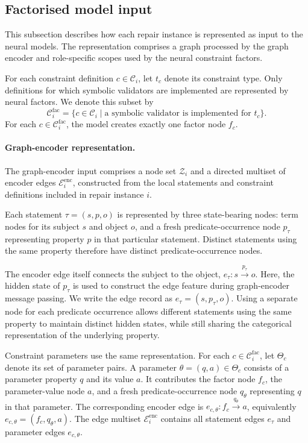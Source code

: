 \documentclass[a4paper,UKenglish,cleveref,autoref,thm-restate]{tgdk-v2021}
\begin{document}
\subsection{Factorised model input}
\label{subsec:factor-graph}

This subsection describes how each repair instance is represented as input to the neural models. The representation comprises a graph processed by the graph encoder and role-specific scopes used by the neural constraint factors.

For each constraint definition \(c\in\mathcal{C}_i\), let \(t_c\) denote its constraint type. Only definitions for which symbolic validators are implemented are represented by neural factors. We denote this subset by
\[
\mathcal{C}_i^{\mathrm{fac}}=\{c\in\mathcal{C}_i\mid\text{a symbolic validator is implemented for }t_c\}.
\]
For each \(c\in\mathcal{C}_i^{\mathrm{fac}}\), the model creates exactly one factor node \(f_c\).

\paragraph*{Graph-encoder representation.} The graph-encoder input comprises a node set \(\mathcal{Z}_i\) and a directed multiset of encoder edges \(\mathcal{E}_i^{\mathrm{enc}}\), constructed from the local statements and constraint definitions included in repair instance \(i\).

Each statement \(\tau=(s,p,o)\) is represented by three state-bearing nodes: term nodes for its subject \(s\) and object \(o\), and a fresh predicate-occurrence node \(p_\tau\) representing property \(p\) in that particular statement. Distinct statements using the same property therefore have distinct predicate-occurrence nodes.

The encoder edge itself connects the subject to the object, \(e_\tau:s\xrightarrow{p_\tau}o\). Here, the hidden state of \(p_\tau\) is used to construct the edge feature during graph-encoder message passing. We write the edge record as \(e_\tau=(s,p_\tau,o)\). Using a separate node for each predicate occurrence allows different statements using the same property to maintain distinct hidden states, while still sharing the categorical representation of the underlying property.

Constraint parameters use the same representation. For each \(c\in\mathcal{C}_i^{\mathrm{fac}}\), let \(\Theta_c\) denote its set of parameter pairs. A parameter \(\theta=(q,a)\in\Theta_c\) consists of a parameter property \(q\) and its value \(a\). It contributes the factor node \(f_c\), the parameter-value node \(a\), and a fresh predicate-occurrence node \(q_\theta\) representing \(q\) in that parameter. The corresponding encoder edge is \(e_{c,\theta}:f_c\xrightarrow{q_\theta}a\), equivalently \(e_{c,\theta}=(f_c,q_\theta,a)\). The edge multiset \(\mathcal{E}_i^{\mathrm{enc}}\) contains all statement edges \(e_\tau\) and parameter edges \(e_{c,\theta}\).
\end{document}
